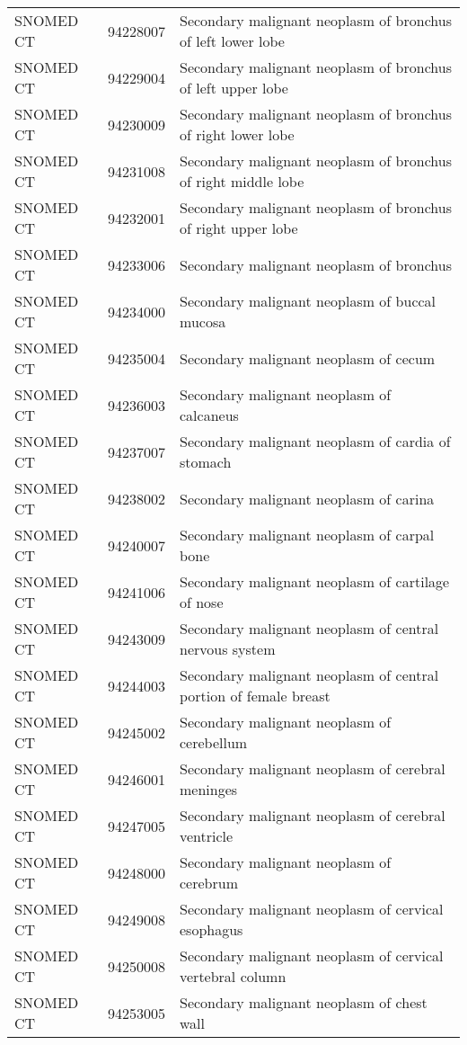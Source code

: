 \begin{longtable}{p{}p{}p{}}
  SNOMED CT & 94228007 & Secondary malignant neoplasm of bronchus of left lower lobe \\ 
  SNOMED CT & 94229004 & Secondary malignant neoplasm of bronchus of left upper lobe \\ 
  SNOMED CT & 94230009 & Secondary malignant neoplasm of bronchus of right lower lobe \\ 
  SNOMED CT & 94231008 & Secondary malignant neoplasm of bronchus of right middle lobe \\ 
  SNOMED CT & 94232001 & Secondary malignant neoplasm of bronchus of right upper lobe \\ 
  SNOMED CT & 94233006 & Secondary malignant neoplasm of bronchus \\ 
  SNOMED CT & 94234000 & Secondary malignant neoplasm of buccal mucosa \\ 
  SNOMED CT & 94235004 & Secondary malignant neoplasm of cecum \\ 
  SNOMED CT & 94236003 & Secondary malignant neoplasm of calcaneus \\ 
  SNOMED CT & 94237007 & Secondary malignant neoplasm of cardia of stomach \\ 
  SNOMED CT & 94238002 & Secondary malignant neoplasm of carina \\ 
  SNOMED CT & 94240007 & Secondary malignant neoplasm of carpal bone \\ 
  SNOMED CT & 94241006 & Secondary malignant neoplasm of cartilage of nose \\ 
  SNOMED CT & 94243009 & Secondary malignant neoplasm of central nervous system \\ 
  SNOMED CT & 94244003 & Secondary malignant neoplasm of central portion of female breast \\ 
  SNOMED CT & 94245002 & Secondary malignant neoplasm of cerebellum \\ 
  SNOMED CT & 94246001 & Secondary malignant neoplasm of cerebral meninges \\ 
  SNOMED CT & 94247005 & Secondary malignant neoplasm of cerebral ventricle \\ 
  SNOMED CT & 94248000 & Secondary malignant neoplasm of cerebrum \\ 
  SNOMED CT & 94249008 & Secondary malignant neoplasm of cervical esophagus \\ 
  SNOMED CT & 94250008 & Secondary malignant neoplasm of cervical vertebral column \\ 
  SNOMED CT & 94253005 & Secondary malignant neoplasm of chest wall \\ 

\end{longtable}
